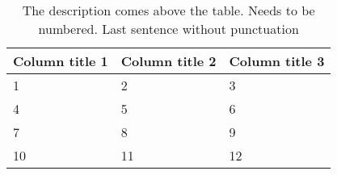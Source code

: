 \begin{table}[ht]
    \caption{The description comes above the table.
    Needs to be numbered.
    Last sentence without punctuation \label{tab:1}}
    \centering
    \begin{tabular}{lll}
        \toprule
        Column title 1 & Column title 2 & Column title 3 \\
        \midrule
        1  & 2  & 3  \\
        4  & 5  & 6  \\
        7  & 8  & 9  \\
        10 & 11 & 12 \\
        \bottomrule
    \end{tabular}
\end{table}